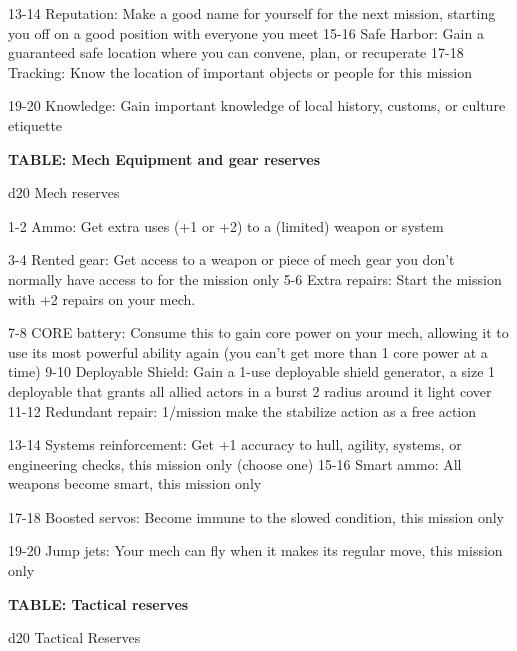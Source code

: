    13-14   Reputation: Make a good name for yourself for the next mission, starting you off on a
           good position with everyone you meet
   15-16   Safe Harbor: Gain a guaranteed safe location where you can convene, plan, or
           recuperate
   17-18   Tracking: Know the location of important objects or people for this mission

   19-20   Knowledge: Gain important knowledge of local history, customs, or culture etiquette

\textbf{TABLE: Mech Equipment and gear reserves}

 d20       Mech	reserves

  1-2      Ammo: Get extra uses (+1 or +2) to a (limited) weapon or system

  3-4      Rented gear: Get access to a weapon or piece of mech gear you don't normally have
           access to for the mission only
  5-6      Extra repairs: Start the mission with +2 repairs on your mech.

  7-8      CORE battery: Consume this to gain core power on your mech, allowing it to use its
           most powerful ability again (you can't get more than 1 core power at a time)
 9-10      Deployable Shield: Gain a 1-use deployable shield generator, a size 1 deployable that
           grants all allied actors in a burst 2 radius around it light cover
   11-12   Redundant repair: 1/mission make the stabilize action as a free action

   13-14   Systems reinforcement: Get +1 accuracy to hull, agility, systems, or engineering
           checks, this mission only (choose one)
   15-16   Smart ammo: All weapons become smart, this mission only

   17-18   Boosted servos: Become immune to the slowed condition, this mission only

   19-20   Jump jets: Your mech can fly when it makes its regular move, this mission only

\textbf{TABLE: Tactical reserves}

 d20       Tactical	Reserves

